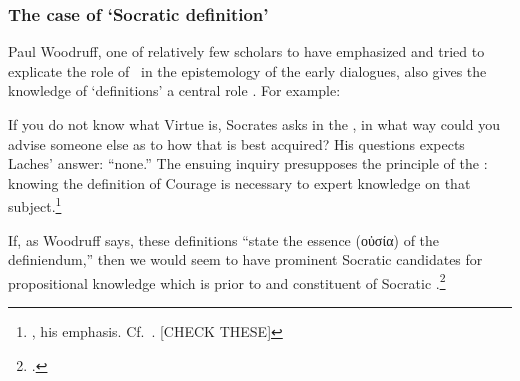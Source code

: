 \documentclass[11pt,letterpaper,oneside]{amsart} %
\begin{document}
\subsubsection*{The case of `Socratic definition'} Paul Woodruff, one of relatively few scholars to have emphasized and tried to explicate the role of \techne\ in the epistemology of the early dialogues, also gives the knowledge of `definitions' a central role  \techne. For example:\begin{squote}If you do not know what Virtue is, Socrates asks in the , in what way could you advise someone else as to how that is best acquired? His questions expects Laches' answer: ``none.'' The ensuing inquiry presupposes the principle of the : knowing the definition of Courage is necessary to expert knowledge on that subject.\footnote{\citet[p.\ 79]{woodruff1987eka}, his emphasis. Cf.\ \citet{woodruff1990pse, sep-plato-ethics-shorter}. [CHECK THESE]}\end{squote}If, as Woodruff says, these definitions ``state the essence (οὐσία) of the definiendum,'' then we would seem to have prominent Socratic candidates for propositional knowledge which is prior to and constituent of Socratic \techne.\footnote{\citet[n.\ 4]{woodruff1987eka}.}
\end{document}
